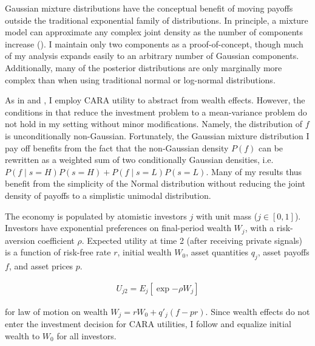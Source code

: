 \documentclass{article}
\begin{document}
\noindent Gaussian mixture distributions have the conceptual benefit of moving payoffs outside the traditional exponential family of distributions. In principle, a mixture model can approximate any complex joint density as the number of components increase (\cite{nguyen_approximations_2019}). I maintain only two components as a proof-of-concept, though much of my analysis expands easily to an arbitrary number of Gaussian components. Additionally, many of the posterior distributions are only marginally more complex than when using traditional normal or log-normal distributions.


As in \textcite{admati_noisy_1985} and \textcite{kacperczyk_rational_2016}, I employ CARA utility to abstract from wealth effects. However, the conditions in \textcite{kacperczyk_rational_2016} that reduce the investment problem to a mean-variance problem do not hold in my setting without minor modifications. Namely, the distribution of $f$ is unconditionally non-Gaussian. Fortunately, the Gaussian mixture distribution I pay off benefits from the fact that the non-Gaussian density $P(f)$ can be rewritten as a weighted sum of two conditionally Gaussian densities, i.e. $P(f \mid s=H)P(s=H) + P(f \mid s=L) P(s=L)$. Many of my results thus benefit from the simplicity of the Normal distribution without reducing the joint density of payoffs to a simplistic unimodal distribution.

The economy is populated by atomistic investors $j$ with unit mass ($j \in [0, 1]$). Investors have exponential preferences on final-period wealth $W_j$, with a risk-aversion coefficient $\rho$. Expected utility at time 2 (after receiving private signals) is a function of risk-free rate $r$, initial wealth $W_0$, asset quantities $q_j$, asset payoffs $f$, and asset prices $p$.

\begin{align}
    U_{j2} = E_j[\exp{-\rho W_j}]
\end{align}

\noindent for law of motion on wealth $W_j = r W_0 + q'_j (f - pr)$. Since wealth effects do not enter the investment decision for CARA utilities, I follow  \textcite{kacperczyk_rational_2016} and equalize initial wealth to $W_0$ for all investors.
\end{document}
